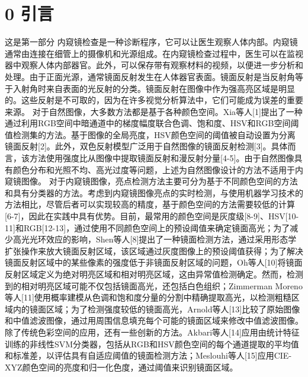 \documentclass[UTF8,a4paper,12pt]{ctexart}
\begin{document}
 
\thispagestyle{empty}       %
\newpage                    %
\newpage
\setcounter{page}{1}        %
 
 
\section{0  引言}
这是第一部分
内窥镜检查是一种诊断程序，它可以让医生观察人体内部。内窥镜通常由连接在细管上的摄像机和光源组成。在内窥镜检查过程中，医生可以在监视器中观察人体内部器官。此外，可以保存带有观察材料的视频，以便进一步分析和处理。由于正面光源，通常镜面反射发生在人体器官表面。镜面反射是当反射角等于入射角时来自表面的光反射的分类。镜面反射在图像中作为强高亮区域是明显的。这些反射是不可取的，因为在许多视觉分析算法中，它们可能成为误差的重要来源。
对于自然图像，大多数方法都是基于各种颜色空间。Xia等人[1]提出了一种通过利用RGB空间中暗通道中的梯度幅度联合色调、饱和度、HSV和RGB空间阈值检测集的方法。基于图像的全局亮度，HSV颜色空间的阈值被自动设置为分离镜面反射[2]。此外，双色反射模型广泛用于自然图像的镜面反射检测[3]。具体而言，该方法使用强度比从图像中提取镜面反射和漫反射分量[4-5]。由于自然图像具有颜色分布和光照不均、高光过度等问题，上述为自然图像设计的方法不适用于内窥镜图像。
对于内窥镜图像，亮点检测方法主要可分为基于不同颜色空间的方法和具有分类器的方法。考虑到内窥镜图像亮点的实时检测，与使用机器学习技术的方法相比，尽管后者可以实现较高的精度，基于颜色空间的方法需要较低的计算[6-7]，因此在实践中具有优势。目前，最常用的颜色空间是灰度级[8-9]、HSV[10-11]和RGB[12-13]，通过使用不同颜色空间上的预设阈值来确定镜面高光；为了减少高光光环效应的影响，Shen等人[8]提出了一种镜面检测方法，通过采用形态学扩张操作来放大镜面反射区域，该区域通过灰度图像上的预设阈值获得；为了解决镜面反射区域中的某些像素的强度低于非镜面反射区域的问题，Oh等人[10]将镜面反射区域定义为绝对明亮区域和相对明亮区域，这由异常值检测确定。然而，检测到的相对明亮区域可能不仅包括镜面高光，还包括白色组织；Zimmerman Moreno等人[11]使用概率建模从色调和饱和度分量的分割中精确提取高光，以检测粗糙区域内的镜面区域；为了检测强度较低的镜面高光，Arnold等人[13]比较了原始图像和中值滤波图像，通过用周围信息填充每个可能的镜面区域来修改中值滤波图像。除了传统色彩空间的应用，还有一些创新的方法。Akbari等人[14]应用由统计特征训练的非线性SVM分类器，包括从RGB和HSV颜色空间的每个通道提取的平均值和标准差，以评估具有自适应阈值的镜面检测方法；Meslouhi等人[15]应用CIE-XYZ颜色空间的亮度和归一化色度，通过阈值来识别镜面区域。
\end{document}
